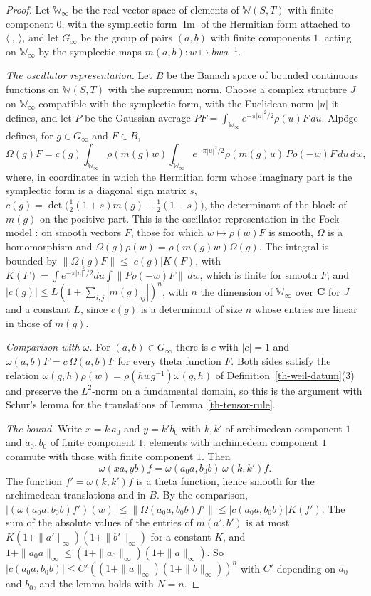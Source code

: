 \begin{proof}
Let $\mathbb W_\infty$ be the real vector space of elements of
$\mathbb W(S,T)$ with finite component $0$, with the symplectic form
$\operatorname{Im}$ of the Hermitian form attached to $\langle\ ,\ \rangle$,
and let $G_\infty$ be the group of pairs $(a,b)$ with finite components $1$,
acting on $\mathbb W_\infty$ by the symplectic maps $m(a,b)\colon w\mapsto bwa^{-1}$.

\emph{The oscillator representation.} Let $B$ be the Banach space of bounded
continuous functions on $\mathbb W(S,T)$ with the supremum norm. Choose a complex
structure $J$ on $\mathbb W_\infty$ compatible with the symplectic form, with
the Euclidean norm $|u|$ it defines, and let $P$ be the Gaussian average
$PF=\int_{\mathbb W_\infty}e^{-\pi|u|^2/2}\rho(u)F\,du$. Alpöge defines, for
$g\in G_\infty$ and $F\in B$,
\[
\Omega(g)F=c(g)\int_{\mathbb W_\infty}\rho(m(g)w)\int_{\mathbb W_\infty}e^{-\pi|u|^2/2}\rho(m(g)u)\,P\rho(-w)F\,du\,dw,
\]
where, in coordinates in which the Hermitian form whose imaginary part is the
symplectic form is a diagonal sign matrix $s$,
$c(g)=\det\bigl(\tfrac12(1+s)m(g)+\tfrac12(1-s)\bigr)$, the determinant of the
block of $m(g)$ on the positive part. This is the oscillator representation in
the Fock model \cite[Chapter~4]{Fol89}: on
smooth vectors $F$, those for which $w\mapsto\rho(w)F$ is smooth, $\Omega$
is a homomorphism and $\Omega(g)\rho(w)=\rho(m(g)w)\Omega(g)$. The integral
is bounded by $\|\Omega(g)F\|\leq|c(g)|K(F)$, with
$K(F)=\int e^{-\pi|u|^2/2}du\int\|P\rho(-w)F\|\,dw$, which is finite for smooth
$F$; and $|c(g)|\leq L(1+\sum_{i,j}|m(g)_{ij}|)^n$, with $n$ the dimension of
$\mathbb W_\infty$ over $\mathbf C$ for $J$ and a constant $L$, since $c(g)$ is a
determinant of size $n$ whose entries are linear in those of $m(g)$.

\emph{Comparison with $\omega$.} For $(a,b)\in G_\infty$ there is $c$ with
$|c|=1$ and $\omega(a,b)F=c\,\Omega(a,b)F$ for every theta function $F$. Both
sides satisfy the relation $\omega(g,h)\rho(w)=\rho(hwg^{-1})\omega(g,h)$ of
Definition~\ref{th-weil-datum}(3) and preserve the $L^2$-norm on a fundamental
domain, so this is the argument with Schur's lemma for the translations of
Lemma~\ref{th-tensor-rule}.

\emph{The bound.} Write $x=k\,a_0$ and $y=k'b_0$ with $k,k'$ of archimedean
component $1$ and $a_0,b_0$ of finite component $1$; elements with
archimedean component $1$ commute with those with finite component $1$. Then
\[
\omega(xa,yb)f=\omega(a_0a,b_0b)\,\omega(k,k')f .
\]
The function $f'=\omega(k,k')f$ is a theta function, hence smooth for the
archimedean translations and in $B$. By the comparison,
$|(\omega(a_0a,b_0b)f')(w)|\leq\|\Omega(a_0a,b_0b)f'\|\leq|c(a_0a,b_0b)|K(f')$.
The sum of the absolute values of the entries of $m(a',b')$ is at most
$K(1+\|a'\|_\infty)(1+\|b'\|_\infty)$ for a constant $K$, and
$1+\|a_0a\|_\infty\leq(1+\|a_0\|_\infty)(1+\|a\|_\infty)$. So
$|c(a_0a,b_0b)|\leq C'((1+\|a\|_\infty)(1+\|b\|_\infty))^n$ with $C'$
depending on $a_0$ and $b_0$, and the lemma holds with $N=n$.
\end{proof}

